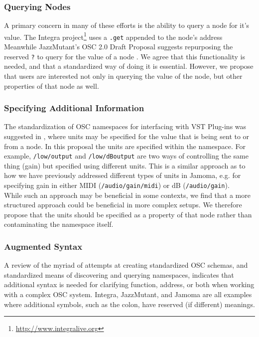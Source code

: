 \documentclass{NIME-alternate}
\begin{document}
\begin{Abstract}
\subsubsection{Querying Nodes}
A primary concern in many of these efforts is the ability to query a node for it's value. The Integra project\footnote{\url{http://www.integralive.org}} uses a \texttt{.get} appended to the node's address
Meanwhile JazzMutant's OSC 2.0 Draft Proposal suggests repurposing the reserved \texttt{?} to query for the value of a node %
\cite{Jazzmutant:2007}. We agree that this functionality is needed, and that a standardized way of doing it is essential.  However, we propose that users are interested not only in querying the value of the node, but other properties of that node as well.

\subsubsection{Specifying Additional Information}
The standardization of OSC namespaces for interfacing with VST Plug-ins was suggested in \cite{Zbyszynski:2005}, where units may be specified for the value that is being sent to or from a node.  In this proposal the units are specified within the namespace.  For example, \texttt{/low/output} and \texttt{/low/dBoutput} are two ways of controlling the same thing (gain) but specified using different units. This is a similar approach as to how we have previously addressed different types of units in Jamoma, e.g. for specifying gain in either MIDI (\texttt{/audio/gain/midi}) or dB (\texttt{/audio/gain}).\\ 
While such an approach may be beneficial in some contexts, we find that a more structured approach could be beneficial in more complex setups. We therefore propose that the units should be specified as a property of that node rather than contaminating the namespace itself.

\subsubsection{Augmented Syntax}

A review of the myriad of attempts at creating standardized OSC schemas, and standardized means of discovering and querying namespaces, indicates that additional syntax is needed for clarifying function, address, or both when working with a complex OSC system.  Integra, JazzMutant, and Jamoma are all examples where additional symbols, such as the colon, have reserved (if different) meanings.


\end{Abstract}
\end{document}
